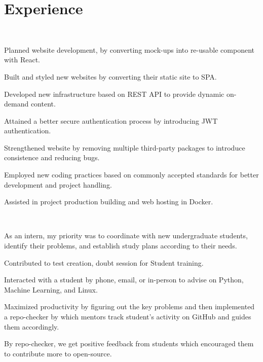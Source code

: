 \documentclass[]{Kushagra-build}
\begin{document}
\hfill
\begin{minipage}[t]{0.70\textwidth} 

\section{Experience}

\\
\vspace{0.7em} 
\vspace{1em}
\begin{tightenumerate}
    \item Planned website development, by converting mock-ups into re-usable component with React.
    \item Built and styled new websites by converting their static site to SPA.
    \item Developed new infrastructure based on REST API to provide dynamic on-demand content.
    \item Attained a better secure authentication process by introducing JWT authentication.
    \item Strengthened website by removing multiple third-party packages to introduce consistence and reducing bugs.
    \item Employed new coding practices based on commonly accepted standards for better development and project handling.
    \item Assisted in project production building and web hosting in Docker.
\end{tightenumerate}
\sectionsep

 \\
\vspace{0.7em} 
\begin{tightenumerate}
    \item As an intern, my priority was to coordinate with new undergraduate students, identify their problems, and establish study plans according to their needs.
    \item Contributed to test creation, doubt session for Student training.
    \item Interacted with a student by phone, email, or in-person to advise on Python, Machine Learning, and Linux.
    \item Maximized productivity by figuring out the key problems and then implemented a repo-checker by which mentors track student's activity on GitHub and guides them accordingly.
    \item By repo-checker, we get positive feedback from students which encouraged them to contribute more to open-source.
\end{tightenumerate}
\sectionsep


\end{minipage}
\end{document}
